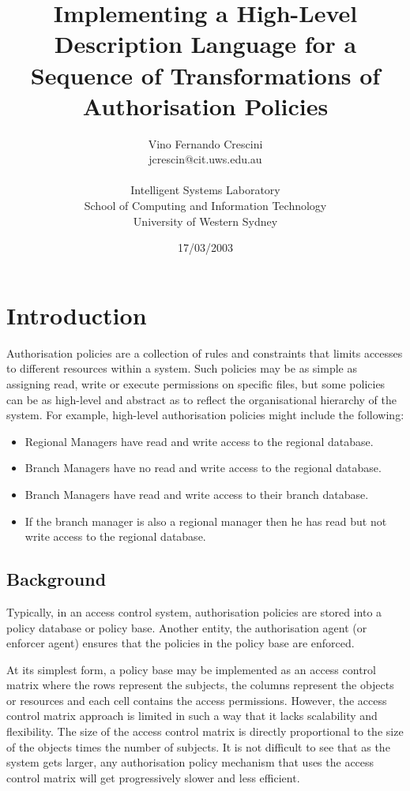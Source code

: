 \documentclass[a4paper,draft]{article}
\author{Vino Fernando Crescini\\jcrescin@cit.uws.edu.au\\\\Intelligent Systems Laboratory\\School of Computing and Information Technology\\University of Western Sydney}
\title{Implementing a High-Level Description Language for a Sequence of Transformations of Authorisation Policies}
\date{17/03/2003}
\begin{document}
  \maketitle
  \section{Introduction}

    Authorisation policies are a collection of rules and constraints that 
    limits accesses to different resources within a system. Such policies may 
    be as simple as assigning read, write or execute permissions on specific 
    files, but some policies can be as high-level and abstract as to reflect 
    the organisational hierarchy of the system. For example, high-level 
    authorisation policies might include the following:

    \begin{itemize}
      \item
        Regional Managers have read and write access to the regional database.
      \item
        Branch Managers have no read and write access to the regional database.
      \item 
        Branch Managers have read and write access to their branch database.
      \item 
         If the branch manager is also a regional manager then he has read
         but not write access to the regional database.
    \end{itemize}

    \subsection{Background}

      Typically, in an access control system, authorisation policies are stored
      into a policy database or policy base. Another entity, the authorisation
      agent (or enforcer agent) ensures that the policies in the policy base
      are enforced. 

      At its simplest form, a policy base may be implemented as an access
      control matrix where the rows represent the subjects, the columns
      represent the objects or resources and each cell contains the access
      permissions. However, the access control matrix approach is limited in
      such a way that it lacks scalability and flexibility. The size of the
      access control matrix is directly proportional to the size of the objects
      times the number of subjects. It is not difficult to see that as the
      system gets larger, any authorisation policy mechanism that uses the
      access control matrix will get progressively slower and less efficient.
\end{document}
